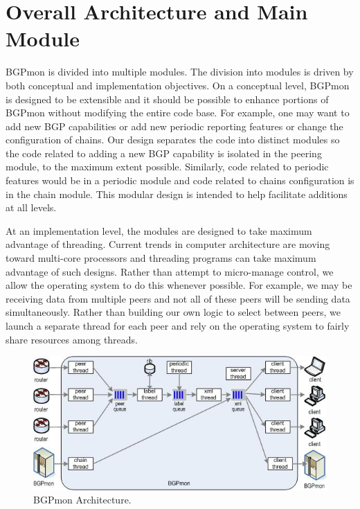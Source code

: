 \section{Overall Architecture and Main Module}
\label{sec:main}

BGPmon is divided into multiple modules.  The division into modules is driven by both conceptual and implementation 
objectives.   On a conceptual level,  BGPmon is designed to be extensible and it should be possible to enhance 
portions of BGPmon without modifying the entire code base.  For example, one may want to add new BGP capabilities or add new periodic reporting features or change the configuration of chains.   Our design separates the code into distinct modules so the code related to adding a new BGP capability is isolated in the peering module, to the maximum extent possible.   Similarly,  code related to periodic features would be in a periodic module and code related to chains configuration is in the chain module.    This modular design is intended to help facilitate additions at all levels.  

At an implementation level, the modules are designed to take maximum advantage of threading.    
Current trends in computer architecture are moving toward multi-core processors and threading programs can take maximum advantage of such designs.   Rather than attempt to micro-manage control, we allow the operating system to do this whenever possible. For example, we may be receiving data from multiple peers and not all of these peers will be sending data simultaneously.   Rather than building our own logic to select between peers, we launch a separate thread for each peer and rely on the operating system to fairly share resources among threads.        

\begin{figure}
\centering
\includegraphics{figs/architecture.jpg}
\caption{BGPmon Architecture.}
\label{fig:architecture}
\end{figure}

